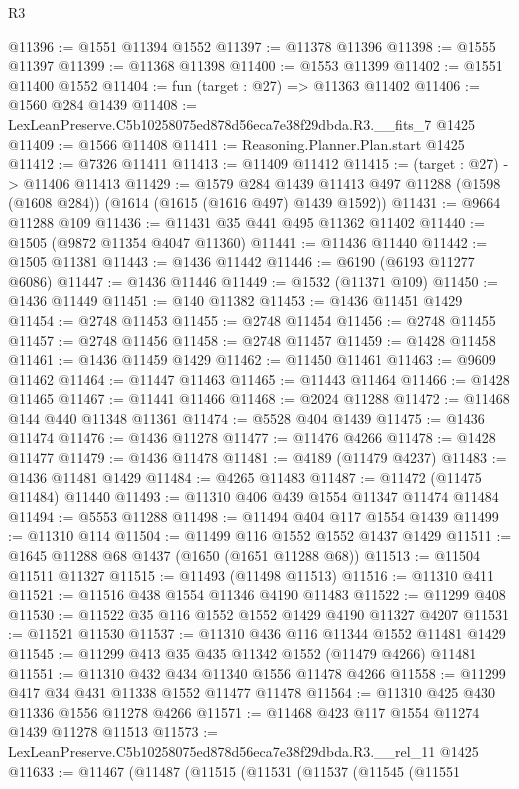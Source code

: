 \begin{lexlean}{R3}
\begin{coremodule}
@11396 := @1551 @11394 @1552
@11397 := @11378 @11396
@11398 := @1555 @11397
@11399 := @11368 @11398
@11400 := @1553 @11399
@11402 := @1551 @11400 @1552
@11404 := fun (target : @27) => @11363 @11402
@11406 := @1560 @284 @1439
@11408 := LexLeanPreserve.C5b10258075ed878d56eca7e38f29dbda.R3.__fits_7 @1425
@11409 := @1566 @11408
@11411 := Reasoning.Planner.Plan.start @1425
@11412 := @7326 @11411
@11413 := @11409 @11412
@11415 := (target : @27) -> @11406 @11413
@11429 := @1579
    @284
    @1439
    @11413
    @497
    @11288
    (@1598 (@1608 @284))
    (@1614 (@1615 (@1616 @497) @1439 @1592))
@11431 := @9664 @11288 @109
@11436 := @11431 @35 @441 @495 @11362 @11402
@11440 := @1505 (@9872 @11354 @4047 @11360)
@11441 := @11436 @11440
@11442 := @1505 @11381
@11443 := @1436 @11442
@11446 := @6190 (@6193 @11277 @6086)
@11447 := @1436 @11446
@11449 := @1532 (@11371 @109)
@11450 := @1436 @11449
@11451 := @140 @11382
@11453 := @1436 @11451 @1429
@11454 := @2748 @11453
@11455 := @2748 @11454
@11456 := @2748 @11455
@11457 := @2748 @11456
@11458 := @2748 @11457
@11459 := @1428 @11458
@11461 := @1436 @11459 @1429
@11462 := @11450 @11461
@11463 := @9609 @11462
@11464 := @11447 @11463
@11465 := @11443 @11464
@11466 := @1428 @11465
@11467 := @11441 @11466
@11468 := @2024 @11288
@11472 := @11468 @144 @440 @11348 @11361
@11474 := @5528 @404 @1439
@11475 := @1436 @11474
@11476 := @1436 @11278
@11477 := @11476 @4266
@11478 := @1428 @11477
@11479 := @1436 @11478
@11481 := @4189 (@11479 @4237)
@11483 := @1436 @11481 @1429
@11484 := @4265 @11483
@11487 := @11472 (@11475 @11484) @11440
@11493 := @11310 @406 @439 @1554 @11347 @11474 @11484
@11494 := @5553 @11288
@11498 := @11494 @404 @117 @1554 @1439
@11499 := @11310 @114
@11504 := @11499 @116 @1552 @1552 @1437 @1429
@11511 := @1645 @11288 @68 @1437 (@1650 (@1651 @11288 @68))
@11513 := @11504 @11511 @11327
@11515 := @11493 (@11498 @11513)
@11516 := @11310 @411
@11521 := @11516 @438 @1554 @11346 @4190 @11483
@11522 := @11299 @408
@11530 := @11522 @35 @116 @1552 @1552 @1429 @4190 @11327 @4207
@11531 := @11521 @11530
@11537 := @11310 @436 @116 @11344 @1552 @11481 @1429
@11545 := @11299 @413 @35 @435 @11342 @1552 (@11479 @4266) @11481
@11551 := @11310 @432 @434 @11340 @1556 @11478 @4266
@11558 := @11299 @417 @34 @431 @11338 @1552 @11477 @11478
@11564 := @11310 @425 @430 @11336 @1556 @11278 @4266
@11571 := @11468 @423 @117 @1554 @11274 @1439 @11278 @11513
@11573 := LexLeanPreserve.C5b10258075ed878d56eca7e38f29dbda.R3.__rel_11 @1425
@11633 := @11467
    (@11487
      (@11515
        (@11531
          (@11537
            (@11545
              (@11551

\end{coremodule}
\end{lexlean}
